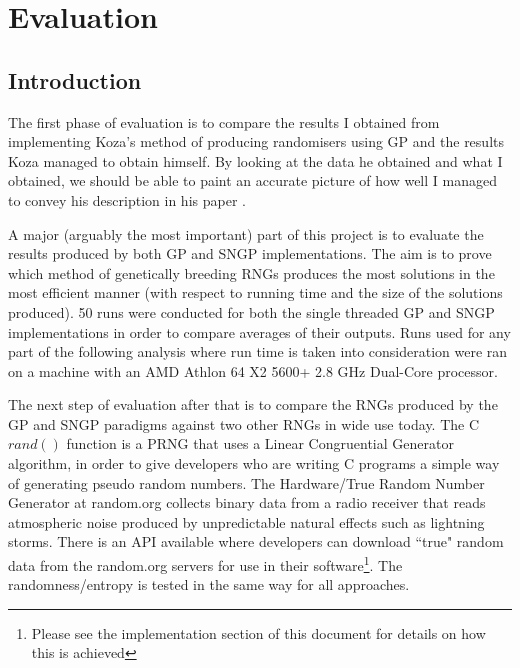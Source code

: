 \documentclass[a4paper,10.5pt]{article}
\begin{document}
\newpage
\section{Evaluation}

\subsection{Introduction}
The first phase of evaluation is to compare the results I obtained from implementing Koza's method of producing randomisers using GP and the results Koza managed to obtain himself. By looking at the data he obtained and what I obtained, we should be able to paint an accurate picture of how well I managed to convey his description in his paper \cite{kozarng}.

A major (arguably the most important) part of this project is to evaluate the results produced by both GP and SNGP implementations. The aim is to prove which method of genetically breeding RNGs produces the most solutions in the most efficient manner (with respect to running time and the size of the solutions produced). 50 runs were conducted for both the single threaded GP and SNGP implementations in order to compare averages of their outputs. Runs used for any part of the following analysis where run time is taken into consideration were ran on a machine with an AMD Athlon 64 X2 5600+ 2.8 GHz Dual-Core processor.

The next step of evaluation after that is to compare the RNGs produced by the GP and SNGP paradigms against two other RNGs in wide use today. The C $rand()$ function is a PRNG that uses a Linear Congruential Generator algorithm, in order to give developers who are writing C programs a simple way of generating pseudo random numbers. The Hardware/True Random Number Generator at random.org collects binary data from a radio receiver that reads atmospheric noise produced by unpredictable natural effects such as lightning storms. There is an API available where developers can download ``true" random data from the random.org servers for use in their software\footnote{Please see the implementation section of this document for details on how this is achieved}. The randomness/entropy is tested in the same way for all approaches.
\end{document}
